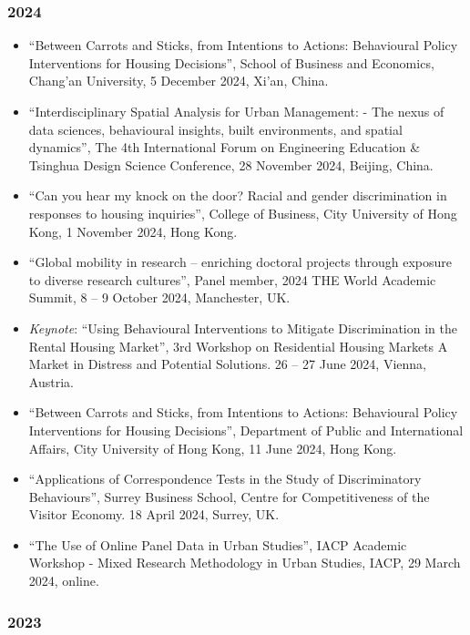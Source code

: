 \documentclass[11pt,a4paper]{article}
\providecommand{\tightlist}{%
  \setlength{\itemsep}{1pt}\setlength{\parskip}{0pt}}
\begin{document}
\subsubsection{2024}\label{section-21}

\begin{itemize}
\tightlist
\item
  ``Between Carrots and Sticks, from Intentions to Actions: Behavioural
  Policy Interventions for Housing Decisions'', School of Business and
  Economics, Chang'an University, 5 December 2024, Xi'an, China.
\item
  ``Interdisciplinary Spatial Analysis for Urban Management: - The nexus
  of data sciences, behavioural insights, built environments, and
  spatial dynamics'', The 4th International Forum on Engineering
  Education \& Tsinghua Design Science Conference, 28 November 2024,
  Beijing, China.
\item
  ``Can you hear my knock on the door? Racial and gender discrimination
  in responses to housing inquiries'', College of Business, City
  University of Hong Kong, 1 November 2024, Hong Kong.
\item
  ``Global mobility in research -- enriching doctoral projects through
  exposure to diverse research cultures'', Panel member, 2024 THE World
  Academic Summit, 8 -- 9 October 2024, Manchester, UK.
\item
  \emph{Keynote}: ``Using Behavioural Interventions to Mitigate
  Discrimination in the Rental Housing Market'', 3rd Workshop on
  Residential Housing Markets A Market in Distress and Potential
  Solutions. 26 -- 27 June 2024, Vienna, Austria.
\item
  ``Between Carrots and Sticks, from Intentions to Actions: Behavioural
  Policy Interventions for Housing Decisions'', Department of Public and
  International Affairs, City University of Hong Kong, 11 June 2024,
  Hong Kong.
\item
  ``Applications of Correspondence Tests in the Study of Discriminatory
  Behaviours'', Surrey Business School, Centre for Competitiveness of
  the Visitor Economy. 18 April 2024, Surrey, UK.
\item
  ``The Use of Online Panel Data in Urban Studies'', IACP Academic
  Workshop - Mixed Research Methodology in Urban Studies, IACP, 29 March
  2024, online.
\end{itemize}

\subsubsection{2023}\label{section-22}
\end{document}
